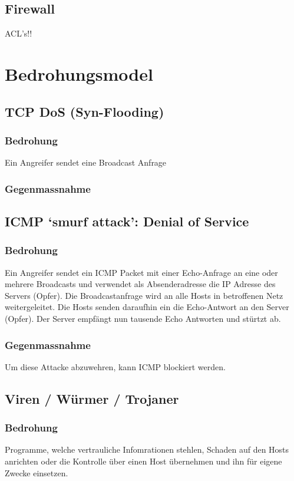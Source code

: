 \documentclass[11pt,a4paper,parskip=half]{scrartcl}
\begin{document}
\subsection{Firewall}
ACL's!!

\section{Bedrohungsmodel}
\subsection{TCP DoS (Syn-Flooding)}
\subsubsection{Bedrohung}
Ein Angreifer sendet eine Broadcast Anfrage
\subsubsection{Gegenmassnahme}
\subsection{ICMP ‘smurf attack’: Denial of Service}
\subsubsection{Bedrohung}
Ein Angreifer sendet ein ICMP Packet mit einer Echo-Anfrage an eine oder mehrere Broadcasts und verwendet als Absenderadresse die IP Adresse des Servers (Opfer). Die Broadcastanfrage wird an alle Hosts in betroffenen Netz weitergeleitet. Die Hosts senden daraufhin ein die Echo-Antwort an den Server (Opfer). Der Server empfängt nun tausende Echo Antworten und stürtzt ab.
\subsubsection{Gegenmassnahme}
Um diese Attacke abzuwehren, kann ICMP blockiert werden.
\subsection{Viren / Würmer / Trojaner}
\subsubsection{Bedrohung}
Programme, welche vertrauliche Infomrationen stehlen, Schaden auf den Hosts anrichten oder die Kontrolle über einen Host übernehmen und ihn für eigene Zwecke einsetzen.
\end{document}
